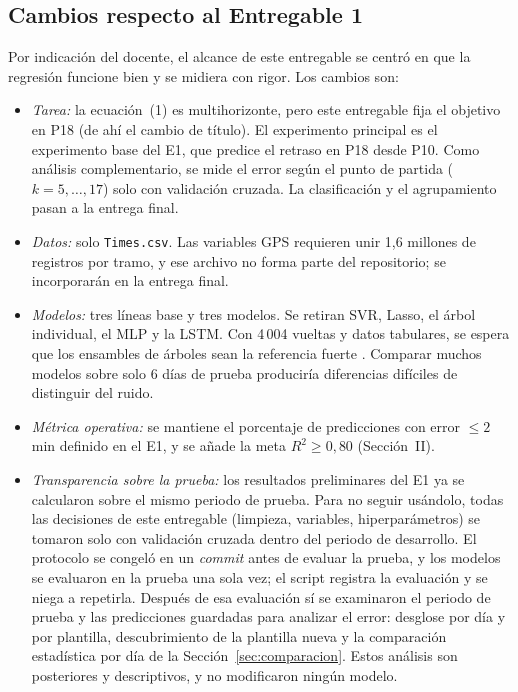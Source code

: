 \documentclass[conference,spanish]{IEEEtran}
\begin{document}
\subsection{Cambios respecto al Entregable 1}\label{sec:cambios}
Por indicación del docente, el alcance de este entregable se centró en que la regresión funcione bien y se midiera con rigor. Los cambios son:
\begin{itemize}
    \item \emph{Tarea:} la ecuación~(1) es multihorizonte, pero este entregable fija el objetivo en P18 (de ahí el cambio de título). El experimento principal es el experimento base del E1, que predice el retraso en P18 desde P10. Como análisis complementario, se mide el error según el punto de partida ($k=5,\dots,17$) solo con validación cruzada. La clasificación y el agrupamiento pasan a la entrega final.
    \item \emph{Datos:} solo \texttt{Times.csv}. Las variables GPS requieren unir 1,6 millones de registros por tramo, y ese archivo no forma parte del repositorio; se incorporarán en la entrega final.
    \item \emph{Modelos:} tres líneas base y tres modelos. Se retiran SVR, Lasso, el árbol individual, el MLP y la LSTM. Con 4\,004 vueltas y datos tabulares, se espera que los ensambles de árboles sean la referencia fuerte \cite{grinsztajn2022}. Comparar muchos modelos sobre solo 6 días de prueba produciría diferencias difíciles de distinguir del ruido.
    \item \emph{Métrica operativa:} se mantiene el porcentaje de predicciones con error $\le2$ min definido en el E1, y se añade la meta $R^2\ge0{,}80$ (Sección~II).
    \item \emph{Transparencia sobre la prueba:} los resultados preliminares del E1 ya se calcularon sobre el mismo periodo de prueba. Para no seguir usándolo, todas las decisiones de este entregable (limpieza, variables, hiperparámetros) se tomaron solo con validación cruzada dentro del periodo de desarrollo. El protocolo se congeló en un \textit{commit} antes de evaluar la prueba, y los modelos se evaluaron en la prueba una sola vez; el script registra la evaluación y se niega a repetirla. Después de esa evaluación sí se examinaron el periodo de prueba y las predicciones guardadas para analizar el error: desglose por día y por plantilla, descubrimiento de la plantilla nueva y la comparación estadística por día de la Sección~\ref{sec:comparacion}. Estos análisis son posteriores y descriptivos, y no modificaron ningún modelo.
\end{itemize}
\end{document}
